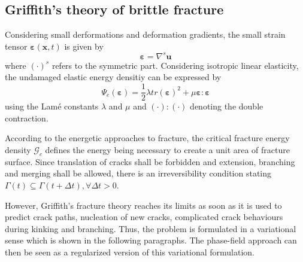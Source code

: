 \subsection{Griffith's theory of brittle fracture} \label{sec:formul_Griffith}
Considering small derformations and deformation gradients, the small strain tensor $\bm{\varepsilon}\left(\mathbf{x},t\right)$ is given by
\begin{equation}
	\bm{\varepsilon} = \nabla^{s}\mathbf{u}
\end{equation}
where $\left(\cdot\right)^{s}$ refers to the symmetric part. Considering isotropic linear elasticity, the undamaged elastic energy densitiy can be expressed by
\begin{equation} \label{eq:psi_e}
	\Psi_ {e}\left(\bm{\varepsilon}\right) = \dfrac{1}{2}\lambda tr\left(\bm{\varepsilon}\right)^{2}+\mu\bm{\varepsilon}:\bm{\varepsilon}
\end{equation}
using the Lam\'{e} constants $\lambda$ and $\mu$ and $\left(\cdot\right):\left(\cdot\right)$ denoting the double contraction.

According to the energetic approaches to fracture, the critical fracture energy density $\mathcal{G}_{c}$ defines the energy being necessary to create a unit area of fracture surface. Since translation of cracks shall be forbidden and extension, branching and merging shall be allowed, there is an irreversibility condition stating $\Gamma\left(t\right)\subseteq\Gamma\left(t+\Delta t\right), \forall \Delta t>0$.

However, Griffith's fracture theory reaches its limits as soon as it is used to predict crack paths, nucleation of new cracks, complicated crack behaviours during kinking and branching. Thus, the problem is formulated in a variational sense which is shown in the following paragraphs. The phase-field approach can then be seen as a regularized version of this variational formulation. \citep{05_PF_ductile}

